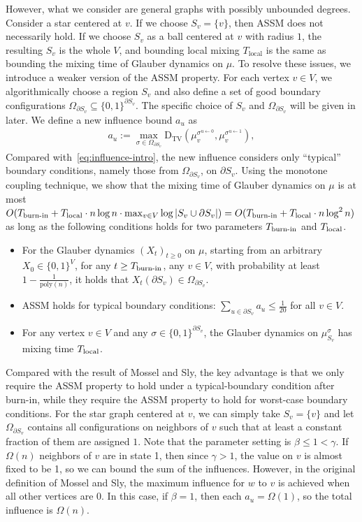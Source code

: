 \documentclass[11pt]{amsart}
\def\-#1{\mathrm{#1}}
\newcommand{\defeq}{:=}
\newcommand{\DTV}[2]{\-D_{\mathrm{TV}}\left({#1},{#2}\right)}
\theoremstyle{definition}
\theoremstyle{remark}
\begin{document}
However, what we consider are general graphs with possibly unbounded degrees. Consider a star centered at $v$. If we choose $S_v=\{v\}$, then ASSM does not necessarily hold. If we choose $S_v$ as a ball centered at $v$ with radius $1$, the resulting $S_v$ is the whole $V$, and bounding local mixing $T_{\text{local}}$ is the same as bounding the mixing time of Glauber dynamics on $\mu$. To resolve these issues, we introduce a weaker version of the ASSM property. For each vertex $v \in V$, we algorithmically choose a region $S_v$ and also define a set of good boundary configurations $\Omega_{\partial S_v} \subseteq \{0,1\}^{\partial S_v}$. The specific choice of $S_v$ and $\Omega_{\partial S_v}$ will be given in later. We define a new influence bound $a_u$ as
\begin{align*}
  a_u \defeq \max_{\sigma \in \Omega_{\partial S_v}} \DTV{\mu^{\sigma^{u \gets 0}}_v}{\mu^{\sigma^{u \gets 1}}_v},
\end{align*}
Compared with~\eqref{eq:influence-intro}, the new influence considers only ``typical'' boundary conditions, namely those from $\Omega_{\partial S_v}$, on $\partial S_v$. Using the monotone coupling technique, we show that the mixing time of Glauber dynamics on $\mu$ is at most $O(T_{\textnormal{burn-in}} + T_{\textnormal{local}} \cdot n \log n \cdot \max_{v \in V} \log |S_v \cup \partial S_v|) = O(T_{\textnormal{burn-in}} + T_{\textnormal{local}} \cdot n \log^2 n)$ as long as the following conditions holds for two parameters $T_{\textnormal{burn-in}}$ and $T_{\textnormal{local}}$.
\begin{itemize}
  \item For the Glauber dynamics $(X_t)_{t \geq 0}$ on $\mu$,
    starting from an arbitrary $X_0 \in \{0,1\}^V$, for any $t \geq T_{\textnormal{burn-in}}$, any $v \in V$, with probability at least $1 - \frac{1}{\mathrm{poly}(n)}$, it holds that $X_t(\partial S_v) \in \Omega_{\partial S_v}$.
    \item ASSM holds for typical boundary conditions: $\sum_{u \in \partial S_v} a_u \leq \frac{1}{20}$ for all $v \in V$.
    \item For any vertex $v \in V$ and any $\sigma \in \{0,1\}^{\partial S_v}$, the Glauber dynamics on $\mu^\sigma_{S_v}$ has mixing time $T_{\textnormal{local}}$.
\end{itemize}

Compared with the result of Mossel and Sly, the key advantage is that we only require the ASSM property to hold under a typical-boundary condition after burn-in, while they require the ASSM property to hold for worst-case boundary conditions. For the star graph centered at $v$, we can simply take $S_v = \{v\}$ and let $\Omega_{\partial S_v}$ contains all configurations on neighbors of $v$ such that at least a constant fraction of them are assigned $1$. Note that the parameter setting is $\beta \leq 1 < \gamma$. If $\Omega(n)$ neighbors of $v$ are in state 1, then since $\gamma > 1$, the value on $v$ is almost fixed to be 1, so we can bound the sum of the influences. However, in the original definition of Mossel and Sly, the maximum influence for $w$ to $v$ is achieved when all other vertices are $0$. In this case, if $\beta = 1$, then each $a_u = \Omega(1)$, so the total influence is $\Omega(n)$.
\end{document}
